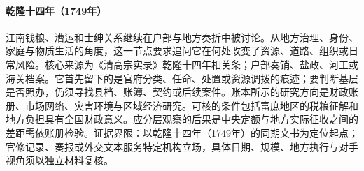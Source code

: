 \hypertarget{social:EQ-1749-JIANGNAN-TAX-REVIEW}{}\paragraph{乾隆十四年（1749年）}江南钱粮、漕运和士绅关系继续在户部与地方奏折中被讨论。从地方治理、身份、家庭与物质生活的角度，这一节点要求追问它在何处改变了资源、道路、组织或日常风险。核心来源为《清高宗实录》乾隆十四年相关条；户部奏销、盐政、河工或海关档案。它首先留下的是官府分类、任命、处置或资源调拨的痕迹；要判断基层是否照办，仍须寻找县档、账簿、契约或后续案件。账本所示的研究方向是财政账册、市场网络、灾害环境与区域经济研究。可核的条件包括富庶地区的税粮征解和地方负担具有全国财政意义。应分层观察的后果是中央定额与地方实际征收之间的差距需依账册检验。证据界限：以乾隆十四年（1749年）的同期文书为定位起点；官修记录、奏报或外交文本服务特定机构立场，具体日期、规模、地方执行与对手视角须以独立材料复核。
